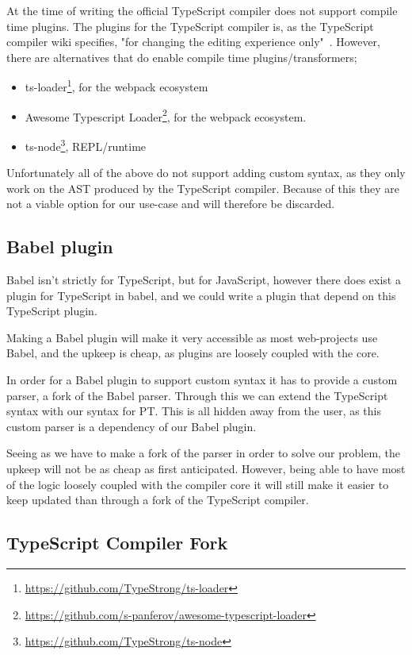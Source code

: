 At the time of writing the official TypeScript compiler does not support compile time plugins.
The plugins for the TypeScript compiler is, as the TypeScript compiler wiki specifies, "for changing the editing experience only"~\cite{tscplugin}.
However, there are alternatives that do enable compile time plugins/transformers;

\begin{itemize}
    \item ts-loader\footnote{\url{https://github.com/TypeStrong/ts-loader}}, for the webpack ecosystem
    \item Awesome Typescript Loader\footnote{\url{https://github.com/s-panferov/awesome-typescript-loader}}, for the webpack ecosystem.
    \item ts-node\footnote{\url{https://github.com/TypeStrong/ts-node}}, REPL/runtime
\end{itemize}

Unfortunately all of the above do not support adding custom syntax, as they only work on the AST produced by the TypeScript compiler.
Because of this they are not a viable option for our use-case and will therefore be discarded.

\subsection{Babel plugin}\label{subsec:babel-plugin}

Babel isn't strictly for TypeScript, but for JavaScript, however there does exist a plugin for TypeScript in babel, and we could write a plugin that depend on this TypeScript plugin.

Making a Babel plugin will make it very accessible as most web-projects use Babel, and the upkeep is cheap, as plugins are loosely coupled with the core.

In order for a Babel plugin to support custom syntax it has to provide a custom parser, a fork of the Babel parser.
Through this we can extend the TypeScript syntax with our syntax for PT\@.
This is all hidden away from the user, as this custom parser is a dependency of our Babel plugin.

Seeing as we have to make a fork of the parser in order to solve our problem, the upkeep will not be as cheap as first anticipated.
However, being able to have most of the logic loosely coupled with the compiler core it will still make it easier to keep updated than through a fork of the TypeScript compiler.

\subsection{TypeScript Compiler Fork}\label{subsec:typescript-compiler-fork}


